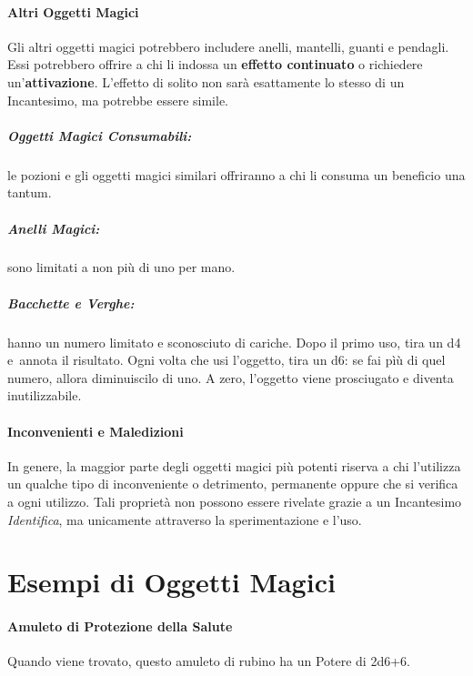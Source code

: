\documentclass[itdr]{subfiles}
\begin{document}
\vfill

\paragraph{Altri Oggetti Magici}
Gli altri oggetti magici potrebbero includere anelli, mantelli, guanti e pendagli. Essi potrebbero offrire a chi li indossa un \textbf{effetto continuato} o richiedere un'\textbf{attivazione}. L'effetto di solito non sarà esattamente lo stesso di un Incantesimo, ma potrebbe essere simile.

\vfill

\subparagraph{Oggetti Magici Consumabili:} le pozioni e gli oggetti magici similari offriranno a chi li consuma un beneficio una tantum.

\vfill

\subparagraph{Anelli Magici:} sono limitati a non più di uno per mano.

\vfill

\subparagraph{Bacchette e Verghe:} hanno un numero limitato e sconosciuto di cariche. Dopo il primo uso, tira un d4 e~annota il risultato. Ogni volta che usi l'oggetto, tira un d6: se fai pìù di quel numero, allora diminuiscilo di uno. A zero, l'oggetto viene prosciugato e diventa inutilizzabile.

\vfill

\paragraph{Inconvenienti e Maledizioni}
In genere, la maggior parte degli oggetti magici più potenti riserva a chi l'utilizza un qualche tipo di inconveniente o detrimento, \mbox{permanente} oppure che si verifica a ogni utilizzo. Tali proprietà non possono essere rivelate grazie a un Incantesimo \textit{Identifica}, ma unicamente attraverso la sperimentazione e l'uso.

\vfill
{}
\vfill
\break


\section{Esempi di Oggetti Magici}

\paragraph{Amuleto di Protezione della Salute}
Quando viene trovato, questo amuleto di rubino ha un Potere di 2d6+6.
\end{document}
